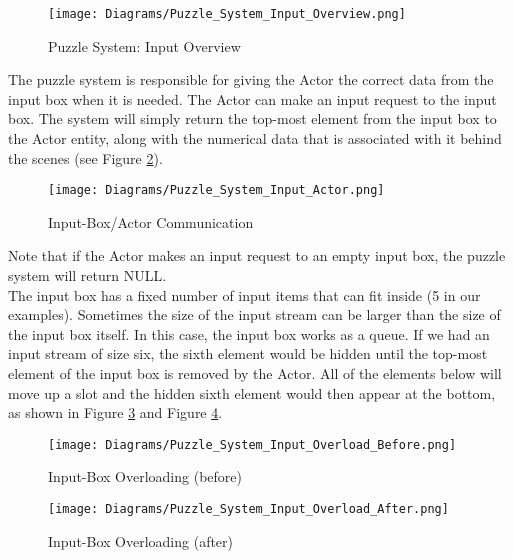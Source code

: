 \begin{figure}[!hb]
  \caption{Puzzle System: Input Overview}
  \label{fig:Puzzle_System_Input_Overview}
  \centering
  \texttt{[image: Diagrams/Puzzle\_System\_Input\_Overview.png]}
\end{figure}
\vfill

The puzzle system is responsible for giving the Actor the correct data from the
input box when it is needed. The Actor can make an input request to the input box.
The system will simply return the top-most element from the input box to the Actor entity, along with the
numerical data that is associated with it behind the scenes (see Figure \ref{fig:Puzzle_System_Input_Actor}).\\

\begin{figure}[!hb]
  \caption{Input-Box/Actor Communication}
  \label{fig:Puzzle_System_Input_Actor}
  \centering
  \texttt{[image: Diagrams/Puzzle\_System\_Input\_Actor.png]}
\end{figure}

Note that if the Actor makes an input request to an empty input box, the puzzle system
will return NULL.\\

The input box has a fixed number of input items that can fit inside (5 in our examples).
Sometimes the size of the input stream can be larger than the size of the input box
itself. In this case, the input box works as a queue. If we had an input stream of
size six, the sixth element would be hidden until the top-most element of the input box
is removed by the Actor. All of the elements below will move up a slot and the
hidden sixth element would then appear at the bottom, as shown in Figure \ref{fig:Puzzle_System_Input_Overload_Before} and
Figure \ref{fig:Puzzle_System_Input_Overload_After}.\\

\begin{figure}[!htb]
  \caption{Input-Box Overloading (before)}
  \label{fig:Puzzle_System_Input_Overload_Before}
  \centering
  \texttt{[image: Diagrams/Puzzle\_System\_Input\_Overload\_Before.png]}
\end{figure}

\begin{figure}[!htb]
  \caption{Input-Box Overloading (after)}
  \label{fig:Puzzle_System_Input_Overload_After}
  \centering
  \texttt{[image: Diagrams/Puzzle\_System\_Input\_Overload\_After.png]}
\end{figure}
\vfill
\clearpage


